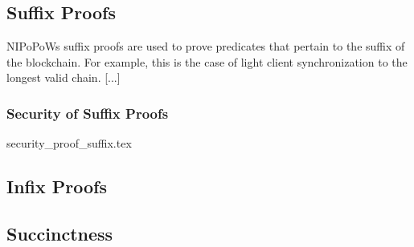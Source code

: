 \subsection{Suffix Proofs}
NIPoPoWs suffix proofs are used to prove predicates that pertain to the suffix of the blockchain. For example, this is the case of light client synchronization to the longest valid chain.
 [...]
 
\subsubsection{Security of Suffix Proofs} \label{proof_under_hard_fork}
{security_proof_suffix.tex} 
 
\subsection{Infix Proofs}

\subsection{Succinctness}
 
